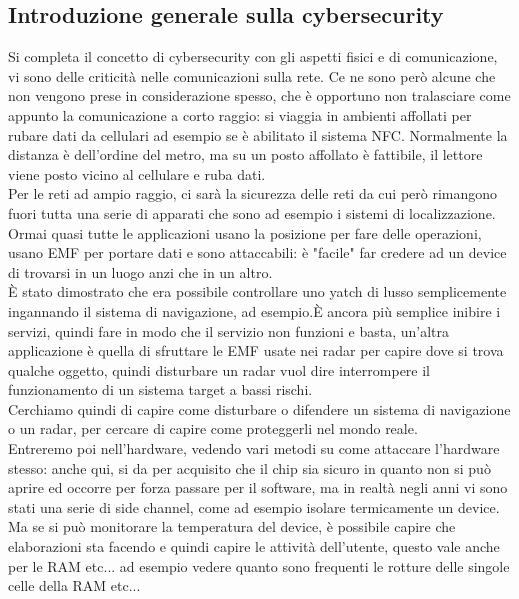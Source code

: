 \documentclass[oneside, 12pt]{extbook}
\begin{document}
\subsection{Introduzione generale sulla cybersecurity}
Si completa il concetto di cybersecurity con gli aspetti fisici e di comunicazione, vi sono delle criticità nelle comunicazioni sulla rete. Ce ne sono però alcune che non vengono prese in considerazione spesso, che è opportuno non tralasciare come appunto la comunicazione a corto raggio: si viaggia in ambienti affollati per rubare dati da cellulari ad esempio se è abilitato il sistema NFC. Normalmente la distanza è dell'ordine del metro, ma su un posto affollato è fattibile, il lettore viene posto vicino al cellulare e ruba dati.\\Per le reti ad ampio raggio, ci sarà la sicurezza delle reti da cui però rimangono fuori tutta una serie di apparati che sono ad esempio i sistemi di localizzazione. Ormai quasi tutte le applicazioni usano la posizione per fare delle operazioni, usano EMF per portare dati e sono attaccabili: è "facile" far credere ad un device di trovarsi in un luogo anzi che in un altro.\\È stato dimostrato che era possibile controllare uno yatch di lusso semplicemente ingannando il sistema di navigazione, ad esempio.È ancora più semplice inibire i servizi, quindi fare in modo che il servizio non funzioni e basta, un'altra applicazione è quella di sfruttare le EMF usate nei radar per capire dove si trova qualche oggetto, quindi disturbare un radar vuol dire interrompere il funzionamento di un sistema target a bassi rischi.\\Cerchiamo quindi di capire come disturbare o difendere un sistema di navigazione o un radar, per cercare di capire come proteggerli nel mondo reale.\\Entreremo poi nell'hardware, vedendo vari metodi su come attaccare l'hardware stesso: anche qui, si da per acquisito che il chip sia sicuro in quanto non si può aprire ed occorre per forza passare per il software, ma in realtà negli anni vi sono stati una serie di side channel, come ad esempio isolare termicamente un device.\\Ma se si può monitorare la temperatura del device, è possibile capire che elaborazioni sta facendo e quindi capire le attività dell'utente, questo vale anche per le RAM etc... ad esempio vedere quanto sono frequenti le rotture delle singole celle della RAM etc...\\
\end{document}
